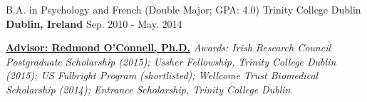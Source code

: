 \begin{cventries}
  \cventry
    {B.A. in Psychology and French (Double Major; GPA: 4.0)} %
    {Trinity College Dublin} %
    {\textbf{Dublin, Ireland}} %
    {Sep. 2010 - May. 2014} %
    {
      \begin{cvitems} %
        \item {{\href{https://oconnell-lab.com/home/meet-the-team/redmond-oconnell/}{\textbf{Advisor: Redmond O'Connell, Ph.D.}}} \textit{Awards: Irish Research Council Postgraduate Scholarship (2015); Ussher Fellowship, Trinity College Dublin (2015); US Fulbright Program (shortlisted); Wellcome Trust Biomedical Scholarship (2014); Entrance Scholarship, Trinity College Dublin}}
      \end{cvitems}
    }

\end{cventries}

